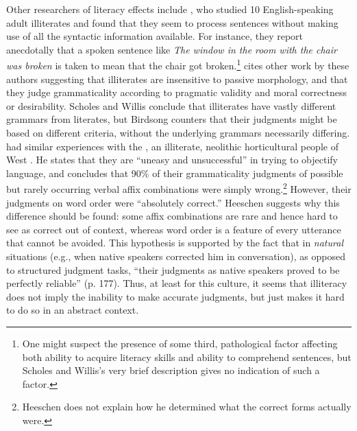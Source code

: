 
Other researchers of literacy effects include \citet{Scholes1987},
who studied 10 English-speaking adult illiterates and found that they seem to process sentences without making use of all the syntactic information available. For instance, they report anecdotally that a spoken sentence like \textit{The window in the room with the chair was broken} is taken to mean that the chair got broken.\footnote{One might suspect the presence of some third, pathological factor affecting both ability to acquire literacy skills and ability to comprehend sentences, but Scholes and Willis's very brief description gives no indication of such a factor.}
\citet{Birdsong1989} cites other work by these authors suggesting that illiterates are insensitive to passive morphology, and that they judge grammaticality according to pragmatic validity and moral correctness or desirability. Scholes and Willis conclude that illiterates have vastly different grammars from literates, but Birdsong counters that their judgments might be based on different criteria, without the underlying grammars necessarily differing. \citet{Heeschen1978} had similar experiences with the , an illiterate, neolithic horticultural people of West . He states that they are ``uneasy and unsuccessful'' in trying to objectify language, and concludes that 90\% of their grammaticality judgments of possible but rarely occurring verbal affix combinations were simply wrong.\footnote{Heeschen does not explain how he determined what the correct forms actually were.}
 However, their judgments on word order were ``absolutely correct.'' Heeschen suggests why this difference should be found: some affix combinations are rare and hence hard to see as correct out of context, whereas word order is a feature of every utterance that cannot be avoided. This hypothesis is supported by the fact that in \textit{natural} situations (e.g., when native speakers corrected him in conversation), as opposed to structured judgment tasks, ``their judgments as native speakers proved to be perfectly reliable'' (p. 177). Thus, at least for this culture, it seems that illiteracy does not imply the inability to make accurate judgments, but just makes it hard to do so in an abstract context.

